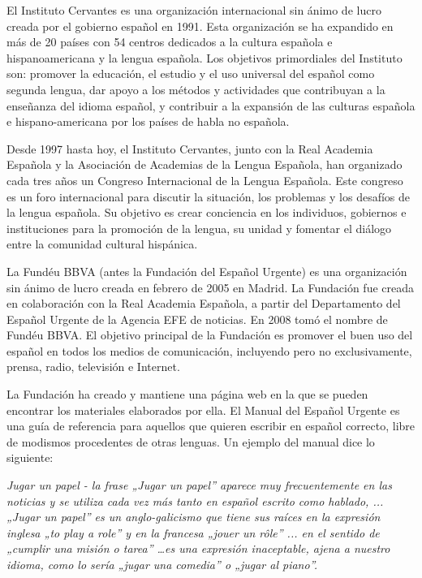 \begin{multicols}{2}
El Instituto Cervantes es una organización internacional sin ánimo de lucro creada por el gobierno español en 1991. Esta organización se ha expandido en más de 20 países con 54 centros dedicados a la cultura española e hispanoamericana y la lengua española. Los objetivos primordiales del Instituto son: promover la educación, el estudio y el uso universal del español como segunda lengua, dar apoyo a los métodos y actividades que contribuyan a la enseñanza del idioma español, y contribuir a la expansión de las culturas española e hispano-americana por los países de habla no española.

Desde 1997 hasta hoy, el Instituto Cervantes, junto con la Real Academia Española y la Asociación de Academias de la Lengua Española, han organizado cada tres años un Congreso Internacional de la Lengua Española. Este congreso es un foro internacional para discutir la situación, los problemas y los desafíos de la lengua española. Su objetivo es crear conciencia en los individuos, gobiernos e instituciones para la promoción de la lengua, su unidad y fomentar el diálogo entre la comunidad cultural hispánica.


La Fundéu BBVA (antes la Fundación del Español Urgente) \cite{fundeu} es una organización sin ánimo de lucro creada en febrero de 2005 en Madrid. La Fundación fue creada en colaboración con la Real Academia Española, a partir del Departamento del Español Urgente de la Agencia EFE de noticias. En 2008 tomó el nombre de Fundéu BBVA. El objetivo principal de la Fundación es promover el buen uso del español en todos los medios de comunicación, incluyendo pero no exclusivamente, prensa, radio, televisión e Internet.

La Fundación ha creado y mantiene una página web en la que se pueden encontrar los materiales elaborados por ella. El Manual del Español Urgente es una guía de referencia para aquellos que quieren escribir en español correcto, libre de modismos procedentes de otras lenguas. Un ejemplo del manual dice lo siguiente:

\textit{Jugar un papel - la frase „Jugar un papel” aparece muy frecuentemente en las noticias y se utiliza cada vez más tanto en español escrito como hablado, ... „Jugar un papel” es un anglo-galicismo que tiene sus raíces en la expresión inglesa „to play a role” y en la francesa „jouer un rôle” ... en el sentido de „cumplir una misión o tarea” \ldots es una expresión inaceptable, ajena a nuestro idioma, como lo sería „jugar una comedia” o „jugar al piano”.}


\end{multicols}

